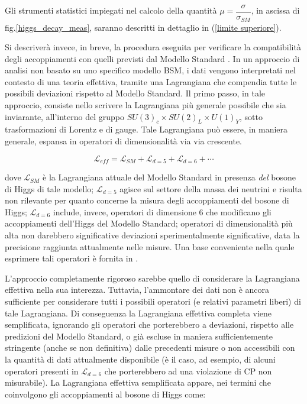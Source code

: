 Gli strumenti statistici impiegati nel calcolo della quantità $\mu=\dfrac{\sigma}{\sigma_{SM}}$, in ascissa di fig.\ref{higgs_decay_meas},
saranno descritti in dettaglio in (\ref{limite superiore}).

\medskip
Si descriverà invece, in breve, la procedura eseguita per verificare la compatibilità degli accoppiamenti con quelli previsti dal 
Modello Standard \cite{coupl_check}.
\newline
In un approccio di analisi non basato su uno specifico modello BSM, i dati vengono interpretati nel contesto di una teoria effettiva, tramite una Lagrangiana
che compendia tutte le possibili deviazioni rispetto al Modello Standard.
Il primo passo, in tale approccio, consiste nello scrivere la Lagrangiana più generale possibile che sia inviarante, all'interno
del gruppo $SU(3)_{c}\times SU(2)_{L}\times U(1)_{Y}$, sotto trasformazioni di Lorentz e di gauge.
Tale Lagrangiana può essere, in maniera generale, espansa in operatori di dimensionalità via via crescente.

\begin{equation}
 \mathcal{L}_{eff}=\mathcal{L}_{SM}+\mathcal{L}_{d=5}+\mathcal{L}_{d=6}+\cdots
\end{equation}

dove $\mathcal{L}_{SM}$ è la Lagrangiana attuale del Modello Standard in presenza \textit{del} bosone di Higgs di tale modello;
$\mathcal{L}_{d=5}$ agisce sul settore della massa dei neutrini e risulta non rilevante per quanto concerne la misura
degli accoppiamenti del bosone di Higgs; $\mathcal{L}_{d=6}$ include, invece, operatori di dimensione 6 che modificano gli 
accoppiamenti dell'Higgs del Modello Standard; operatori di dimensionalità più alta non darebbero significative deviazioni sperimentalmente significative,
data la precisione raggiunta attualmente nelle misure. Una base conveniente nella quale esprimere tali operatori è fornita
in \cite{coupl_check_2}.

L'approccio completamente rigoroso sarebbe quello di considerare la Lagrangiana effettiva nella sua interezza. Tuttavia,
l'ammontare dei dati non è ancora sufficiente per considerare tutti i possibili operatori (e relativi parametri liberi)
di tale Lagrangiana. Di conseguenza
la Lagrangiana effettiva completa viene semplificata, ignorando gli operatori che porterebbero a
deviazioni, rispetto alle predizioni del Modello Standard, o già escluse in maniera sufficientemente stringente (anche se non
definitiva) dalle precedenti misure o non accessibili con la quantità di dati attualmente disponibile (è il caso, ad esempio,
di alcuni operatori presenti in $\mathcal{L}_{d=6}$ che porterebbero
ad una violazione di CP non misurabile).
\newline
La Lagrangiana effettiva semplificata appare, nei termini che coinvolgono gli accoppiamenti al bosone di Higgs come:

